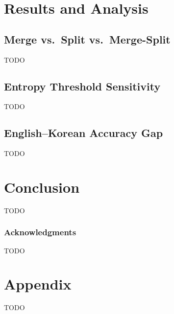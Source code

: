 \documentclass{article} %
\begin{document}
\section{Results and Analysis}
\label{sec:results}

\subsection{Merge vs.\ Split vs.\ Merge-Split}
TODO

\subsection{Entropy Threshold Sensitivity}
TODO

\subsection{English--Korean Accuracy Gap}
TODO

\section{Conclusion}
\label{sec:conclusion}

TODO

\subsubsection*{Acknowledgments}
TODO




\appendix
\section{Appendix}
TODO
\end{document}
